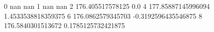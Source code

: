 0 nan nan
1 nan nan
2 176.405517578125 0.0
4 177.85887145996094 1.4533538818359375
6 176.0862579345703 -0.3192596435546875
8 176.5840301513672 0.1785125732421875
